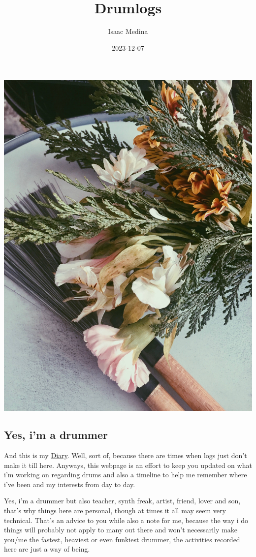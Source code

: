 \documentclass[
]{book}
\title{Drumlogs}
\author{Isaac Medina}
\date{2023-12-07}
\begin{document}
\maketitle

{
\setcounter{tocdepth}{1}
\tableofcontents
}
\hypertarget{section}{%
\chapter*{}\label{section}}

\begin{center}\includegraphics[width=0.6\linewidth]{images/flowerBrush1} \end{center}

\hypertarget{yes-im-a-drummer}{%
\section*{Yes, i'm a drummer}\label{yes-im-a-drummer}}

And this is my \protect\hyperlink{Diary}{Diary}. Well, sort of, because there are times when logs just don't make it till here. Anyways, this webpage is an effort to keep you updated on what i'm working on regarding drums and also a timeline to help me remember where i've been and my interests from day to day.

Yes, i'm a drummer but also teacher, synth freak, artist, friend, lover and son, that's why things here are personal, though at times it all may seem very technical. That's an advice to you while also a note for me, because the way i do things will probably not apply to many out there and won't necessarily make you/me the fastest, heaviest or even funkiest drummer, the activities recorded here are just a way of being.
\end{document}
